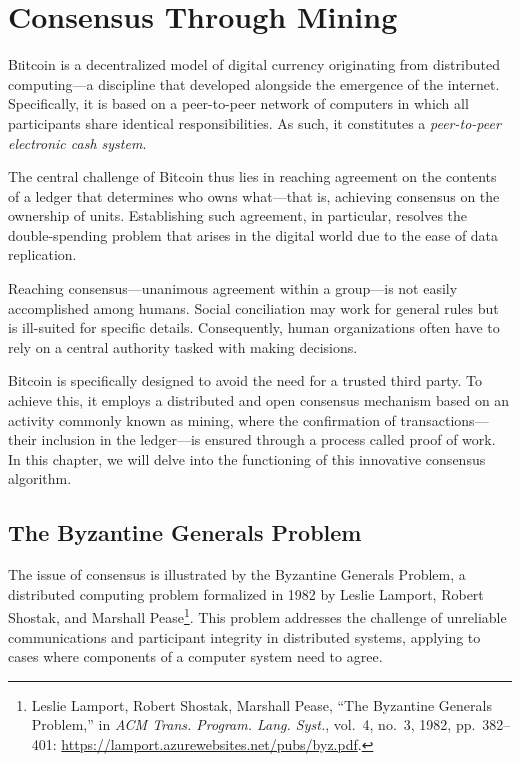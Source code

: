 \documentclass[
  a5paper,
  smalldemyvopaper,10pt,twoside,onecolumn,openright,extrafontsizes,hidelinks]{memoir}
\begin{document}

\chapter{Consensus Through Mining}\label{ch:confirmation}

\label{enotezch:8}{}

{B}\textsc{i}itcoin is a decentralized model of digital currency
originating from distributed computing---a discipline that developed
alongside the emergence of the internet. Specifically, it is based on a
peer-to-peer network of computers in which all participants share
identical responsibilities. As such, it constitutes a \emph{peer-to-peer
electronic cash system}.

The central challenge of Bitcoin thus lies in reaching agreement on the
contents of a ledger that determines who owns what---that is, achieving
consensus on the ownership of units. Establishing such agreement, in
particular, resolves the double-spending problem that arises in the
digital world due to the ease of data replication.

Reaching consensus---unanimous agreement within a group---is not easily
accomplished among humans. Social conciliation may work for general
rules but is ill-suited for specific details. Consequently, human
organizations often have to rely on a central authority tasked with
making decisions.

Bitcoin is specifically designed to avoid the need for a trusted third
party. To achieve this, it employs a distributed and open consensus
mechanism based on an activity commonly known as mining, where the
confirmation of transactions---their inclusion in the ledger---is
ensured through a process called proof of work. In this chapter, we will
delve into the functioning of this innovative consensus algorithm.

\section*{The Byzantine Generals
Problem}\label{le-probluxe8me-des-guxe9nuxe9raux-byzantins}


The issue of consensus is illustrated by the Byzantine Generals Problem,
a distributed computing problem formalized in 1982 by Leslie Lamport,
Robert Shostak, and Marshall Pease\footnote{Leslie Lamport, Robert
  Shostak, Marshall Pease, ``The Byzantine Generals Problem,'' in
  \emph{ACM Trans. Program. Lang. Syst.}, vol.~4, no.~3, 1982,
  pp.~382--401: \url{https://lamport.azurewebsites.net/pubs/byz.pdf}.}.
This problem addresses the challenge of unreliable communications and
participant integrity in distributed systems, applying to cases where
components of a computer system need to agree.
\end{document}
